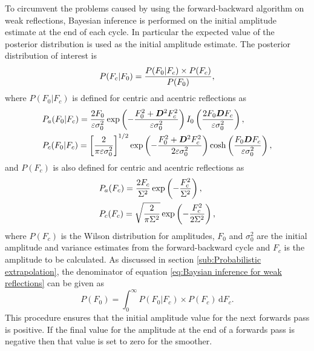 To circumvent the problems caused by using the forward-backward algorithm on weak reflections, Bayesian inference is performed on the initial amplitude estimate at the end of each cycle.
In particular the expected value of the posterior distribution is used as the initial amplitude estimate.
The posterior distribution of interest is
\begin{equation}
	P(F_c | F_0) = \frac{P(F_0 | F_c) \times P(F_c)}{P(F_0)},
	\label{eq:Baysian inference for weak reflections}
\end{equation}
where $P(F_0 | F_c)$ is defined for centric and acentric reflections as
\begin{align}
    &P_a(F_0 | F_c) = \frac{2F_0}{\varepsilon \sigma_{0}^2} \exp \left(-\frac{F_0^2 + \boldsymbol{D}^2F_c^2}{\varepsilon \sigma_{0}^2}\right)I_0 \left(\frac{2F_0\boldsymbol{D}F_c}{\varepsilon \sigma_{0}^2}\right), \label{eq:Weak reflection likelihood function - acentric reflections} \\
    &P_c(F_0 | F_c) = \left[\frac{2}{\pi \varepsilon \sigma_{0}^2}\right]^{1/2} \exp \left(-\frac{F_0^2 + \boldsymbol{D}^2F_c^2}{2\varepsilon \sigma_{0}^2}\right) \cosh \left(\frac{F_0\boldsymbol{D}F_c}{\varepsilon \sigma_{0}^2}\right), \label{eq:Weak reflection likelihood function - centric reflections}
\end{align}
and $P(F_c)$ is also defined for centric and acentric reflections as
\begin{align}
    &P_a(F_c) = \frac{2F_c}{\Sigma^2} \exp \left(-\frac{F_c^2}{\Sigma^2}\right), \label{eq:Weak reflection prior distribution - acentric reflections} \\
    &P_c(F_c) = \sqrt{\frac{2}{\pi \Sigma^2}} \exp \left(-\frac{F_c^2}{2\Sigma^2}\right), \label{eq:Weak reflection prior distribution - centric reflections}
\end{align}
where $P(F_c)$ is the Wilson distribution for amplitudes, $F_0$ and $\sigma_{0}^2$ are the initial amplitude and variance estimates from the forward-backward cycle and $F_c$ is the amplitude to be calculated.
As discussed in section \ref{sub:Probabilistic extrapolation}, the denominator of equation \ref{eq:Baysian inference for weak reflections} can be given as
\begin{equation}
	P(F_0) = \int_0^{\infty} P(F_0 | F_c) \times P(F_c)\, \mathrm{d}F_c.
\end{equation}
This procedure ensures that the initial amplitude value for the next forwards pass is positive.
If the final value for the amplitude at the end of a forwards pass is negative then that value is set to zero for the smoother.
